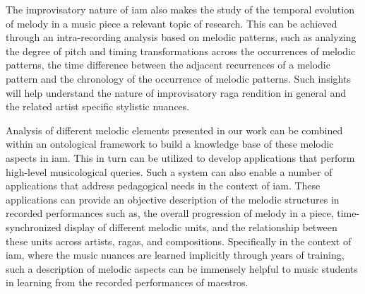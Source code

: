 The improvisatory nature of \gls{iam} also makes the study of the temporal evolution of melody in a music piece a relevant topic of research. This can be achieved through an intra-recording analysis based on melodic patterns, such as analyzing the degree of pitch and timing transformations across the occurrences of melodic patterns, the time difference between the adjacent recurrences of a melodic pattern and the chronology of the occurrence of melodic patterns. Such insights will help understand the nature of improvisatory \gls{raga} rendition in general and the related artist specific stylistic nuances.

 Analysis of different melodic elements presented in our work can be combined within an ontological framework to build a knowledge base of these melodic aspects in \gls{iam}. This in turn can be utilized to develop applications that perform high-level musicological queries. Such a system can also enable a number of applications that address pedagogical needs in the context of \gls{iam}. These applications can provide an objective description of the melodic structures in recorded performances such as, the overall progression of melody in a piece, time-synchronized display of different melodic units, and the relationship between these units across artists, \glspl{raga}, and compositions. Specifically in the context of \gls{iam}, where the music nuances are learned implicitly through years of training, such a description of melodic aspects can be immensely helpful to music students in learning from the recorded performances of maestros.


